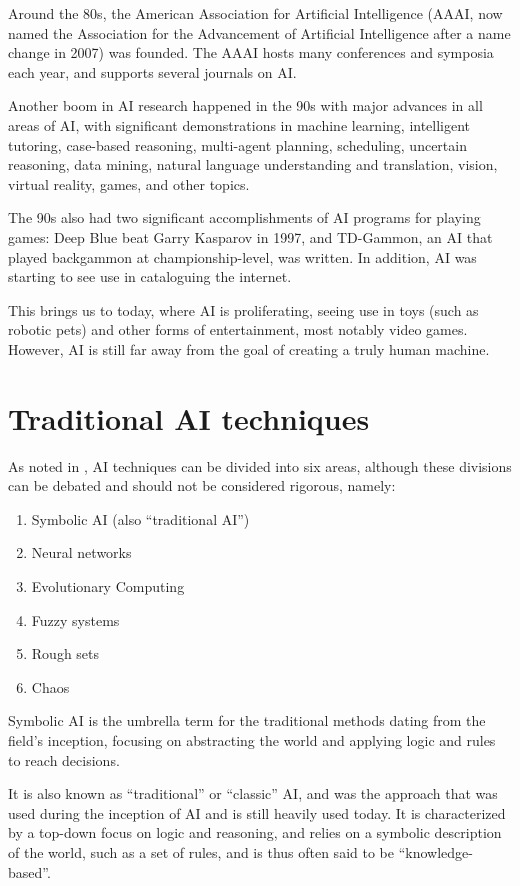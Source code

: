 Around the 80s, the American Association for Artificial Intelligence (AAAI, now
named the Association for the Advancement of Artificial Intelligence after a
name change in 2007) was founded. The AAAI hosts many conferences and symposia
each year, and supports several journals on AI.

Another boom in AI research happened in the 90s with major advances in all areas
of AI, with significant demonstrations in machine learning, intelligent
tutoring, case-based reasoning, multi-agent planning, scheduling, uncertain
reasoning, data mining, natural language understanding and translation, vision,
virtual reality, games, and other topics.

The 90s also had two significant accomplishments of AI programs for playing
games: Deep Blue beat Garry Kasparov in 1997, and TD-Gammon, an AI that played
backgammon at championship-level, was written. In addition, AI was starting to
see use in cataloguing the internet.

This brings us to today, where AI is proliferating, seeing use in toys (such as
robotic pets) and other forms of entertainment, most notably video games.
However, AI is still far away from the goal of creating a truly human machine.

\section{Traditional AI techniques}
\label{sec:trad-ai-techn}

As noted in \citet[chap.~1]{munakata2008fundamentals}, AI techniques can be
divided into six areas, although these divisions can be debated and should not
be considered rigorous, namely:

\begin{enumerate}
\item Symbolic AI (also ``traditional AI'')
\item Neural networks
\item Evolutionary Computing
\item Fuzzy systems
\item Rough sets
\item Chaos
\end{enumerate}

Symbolic AI is the umbrella term for the traditional methods dating from the
field's inception, focusing on abstracting the world and applying logic and
rules to reach decisions.

It is also known as ``traditional'' or ``classic'' AI, and was the approach that
was used during the inception of AI and is still heavily used today. It is
characterized by a top-down focus on logic and reasoning, and relies on a
symbolic description of the world, such as a set of rules, and is thus often
said to be ``knowledge-based''.


